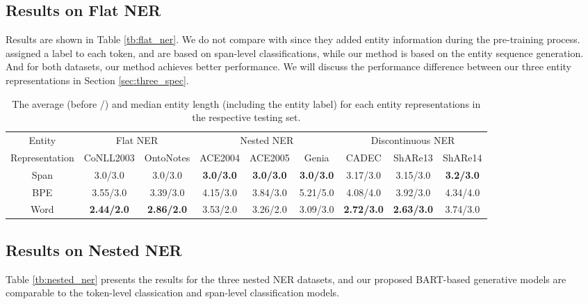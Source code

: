 \documentclass[11pt,a4paper]{article}
\begin{document}
\subsection{Results on Flat NER}
Results are shown in Table \ref{tb:flat_ner}. We do not compare with \citet{DBLP:conf/emnlp/YamadaASTM20} since they added entity information during the pre-training process. \citet{DBLP:conf/emnlp/ClarkLML18,DBLP:conf/naacl/PetersNIGCLZ18,DBLP:conf/naacl/AkbikBV19,DBLP:conf/acl/StrakovaSH19} assigned a label to each token, and \citet{DBLP:conf/acl/LiFMHWL20,DBLP:conf/acl/YuBP20} are based on span-level classifications, while our method is based on the entity sequence generation. And for both datasets, our method achieves better performance. We will discuss the performance difference between our three entity representations in Section \ref{sec:three_spec}.

\begin{table*}[bth]
  \centering
  \setlength{\tabcolsep}{2pt}  \renewcommand{\arraystretch}{1.2}
  \begin{tabular}{c|c|c|c|c|c|c|c|c}
\toprule
     Entity& \multicolumn{2}{c|}{Flat NER} & \multicolumn{3}{c|}{Nested NER} & \multicolumn{3}{c}{Discontinuous NER} \\
     \cline{2-9}
Representation & CoNLL2003 & OntoNotes & ACE2004  & ACE2005  & Genia    & CADEC    & ShARe13 & ShARe14 \\
\midrule
   Span & 3.0/3.0   & 3.0/3.0   & \textbf{3.0/3.0}  & \textbf{3.0/3.0}  & \textbf{3.0/3.0}  & 3.17/3.0 & 3.15/3.0  & \textbf{3.2/3.0} \\
  BPE  & 3.55/3.0  & 3.39/3.0  & 4.15/3.0 & 3.84/3.0 & 5.21/5.0 & 4.08/4.0 & 3.92/3.0 & 4.34/4.0 \\
  Word & \textbf{2.44/2.0}  & \textbf{2.86/2.0}  & 3.53/2.0  & 3.26/2.0 & 3.09/3.0 & \textbf{2.72/3.0} & \textbf{2.63/3.0} & 3.74/3.0 \\
\bottomrule
  \end{tabular}
  \caption{The average (before /) and median entity length (including the entity label) for each entity representations in the respective testing set.}
  \label{tb:avg_length}
\end{table*}

\subsection{Results on Nested NER}
Table \ref{tb:nested_ner} presents the results for the three nested NER datasets, and our proposed BART-based generative models are comparable to the token-level classication \citep{DBLP:conf/acl/StrakovaSH19,DBLP:journals/tacl/ShibuyaH20} and span-level classification \citep{DBLP:conf/naacl/LuanWHSOH19,DBLP:conf/acl/LiFMHWL20,DBLP:conf/acl/WangSCC20} models.
\end{document}
